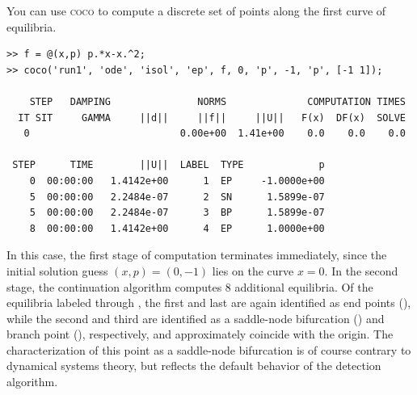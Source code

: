 You can use \textsc{coco} to compute a discrete set of points along the first curve of equilibria.
\begin{lstlisting}[language=coco-highlight,frame=lines]
>> f = @(x,p) p.*x-x.^2;
>> coco('run1', 'ode', 'isol', 'ep', f, 0, 'p', -1, 'p', [-1 1]);

    STEP   DAMPING               NORMS              COMPUTATION TIMES
  IT SIT     GAMMA     ||d||     ||f||     ||U||   F(x)  DF(x)  SOLVE
   0                          0.00e+00  1.41e+00    0.0    0.0    0.0

 STEP      TIME        ||U||  LABEL  TYPE             p
    0  00:00:00   1.4142e+00      1  EP     -1.0000e+00
    5  00:00:00   2.2484e-07      2  SN      1.5899e-07
    5  00:00:00   2.2484e-07      3  BP      1.5899e-07
    8  00:00:00   1.4142e+00      4  EP      1.0000e+00
\end{lstlisting}
In this case, the first stage of computation terminates immediately, since the initial solution guess $(x,p)=(0,-1)$ lies on the curve $x=0$. In the second stage, the continuation algorithm computes 8 additional equilibria. Of the equilibria labeled  through , the first and last are again identified as end points (), while the second and third are identified as a saddle-node bifurcation () and branch point (), respectively, and approximately coincide with the origin. The characterization of this point as a saddle-node bifurcation is of course contrary to dynamical systems theory, but reflects the default behavior of the detection algorithm.

